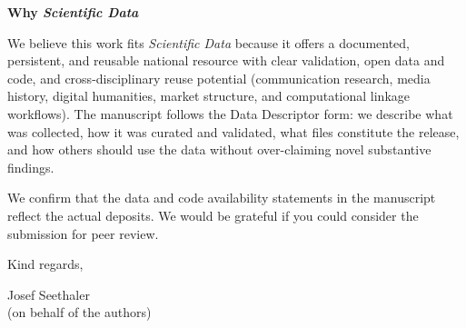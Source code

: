\documentclass[11pt]{article}
\begin{document}
\medskip

\noindent\textbf{Why \textit{Scientific Data}}

We believe this work fits \textit{Scientific Data} because it offers a documented, persistent, and reusable national resource with clear validation, open data and code, and cross-disciplinary reuse potential (communication research, media history, digital humanities, market structure, and computational linkage workflows). The manuscript follows the Data Descriptor form: we describe what was collected, how it was curated and validated, what files constitute the release, and how others should use the data without over-claiming novel substantive findings.

We confirm that the data and code availability statements in the manuscript reflect the actual deposits. We would be grateful if you could consider the submission for peer review.

\bigskip

\noindent Kind regards,

\medskip

\noindent Josef Seethaler\\
(on behalf of the authors)\\
\end{document}
